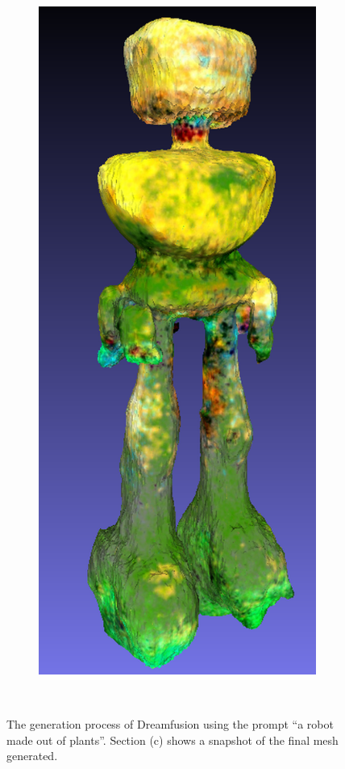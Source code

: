\begin{figure}[ht]
\begin{subfigure}[b]{0.252\textwidth}
        \includegraphics[width=\textwidth]{etc/a robot made out of plants/dreamfusion/dreamfusion_plantrobot_model_resized.png}
        \caption{}
    \end{subfigure}
    \caption{The generation process of Dreamfusion using the prompt ``a robot made out of plants''. Section (c) shows a snapshot of the final mesh generated.}~\label{fig:generationDreamFusion}
\end{figure}

